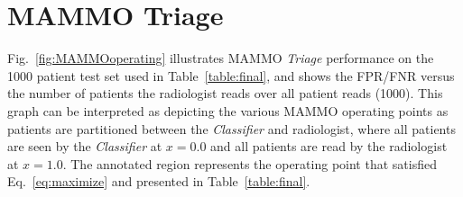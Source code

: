 \documentclass[journal]{IEEEtran}
\begin{document}
\section{\label{Appendix:triage} MAMMO Triage}

Fig.~\ref{fig:MAMMOoperating} illustrates MAMMO \textit{Triage} performance on the 1000 patient test set used in Table~\ref{table:final}, and shows the FPR/FNR versus the number of patients the radiologist reads over all patient reads (1000).  This graph can be interpreted as depicting the various MAMMO operating points as patients are partitioned between the \textit{Classifier} and radiologist, where all patients are seen by the \textit{Classifier} at $x = 0.0$ and all patients are read by the radiologist at $x = 1.0$.  The annotated region represents the operating point that satisfied Eq.~\ref{eq:maximize} and presented in Table~\ref{table:final}. 
\end{document}
